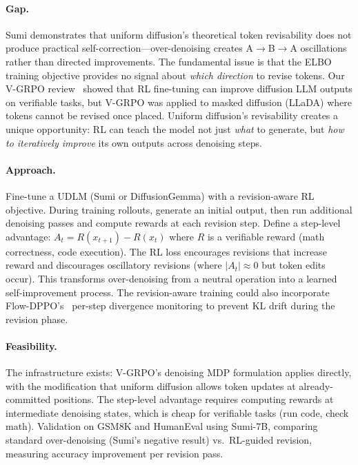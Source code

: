 \documentclass[11pt,a4paper]{article}
\begin{document}
\paragraph{Gap.} Sumi demonstrates that uniform diffusion's theoretical token revisability does not produce practical self-correction---over-denoising creates A$\to$B$\to$A oscillations rather than directed improvements. The fundamental issue is that the ELBO training objective provides no signal about \emph{which direction} to revise tokens. Our V-GRPO review~\cite{li2026vgrpo} showed that RL fine-tuning can improve diffusion LLM outputs on verifiable tasks, but V-GRPO was applied to masked diffusion (LLaDA) where tokens cannot be revised once placed. Uniform diffusion's revisability creates a unique opportunity: RL can teach the model not just \emph{what} to generate, but \emph{how to iteratively improve} its own outputs across denoising steps.

\paragraph{Approach.} Fine-tune a UDLM (Sumi or DiffusionGemma) with a revision-aware RL objective. During training rollouts, generate an initial output, then run additional denoising passes and compute rewards at each revision step. Define a step-level advantage: $A_t = R(x_{t+1}) - R(x_t)$ where $R$ is a verifiable reward (math correctness, code execution). The RL loss encourages revisions that increase reward and discourages oscillatory revisions (where $|A_t| \approx 0$ but token edits occur). This transforms over-denoising from a neutral operation into a learned self-improvement process. The revision-aware training could also incorporate Flow-DPPO's~\cite{ping2026flowdppo} per-step divergence monitoring to prevent KL drift during the revision phase.

\paragraph{Feasibility.} The infrastructure exists: V-GRPO's denoising MDP formulation applies directly, with the modification that uniform diffusion allows token updates at already-committed positions. The step-level advantage requires computing rewards at intermediate denoising states, which is cheap for verifiable tasks (run code, check math). Validation on GSM8K and HumanEval using Sumi-7B, comparing standard over-denoising (Sumi's negative result) vs.\ RL-guided revision, measuring accuracy improvement per revision pass.
\end{document}
